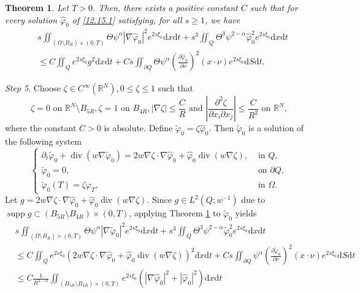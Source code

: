 \documentclass[11pt]{article}
\newcommand{\R}{{\mathbb R}}
\newtheorem{theorem}{Theorem}[section]
\numberwithin{equation}{section}
\def\pt{\partial}
\def\vp{\varphi}
\def\pt{\partial}
\def\Om{\Omega}
\def\al{\alpha}
\def\iy{\infty}
\def\f{\frac}
\def\df{\mathrm d}
\def\wt{\widetilde}
\def\wh{\widehat}
\DeclareMathOperator{\Div}{div}
\DeclareMathOperator{\supp}{{supp}}
\begin{document}
\begin{theorem}\label{12.23.T1}
Let $T>0$. Then, there exists a positive constant $C$ such that for every solution $\wh\vp_0$ of \eqref{12.15.1} satisfying, for all $s\geq 1$, we have
\begin{equation*}
\begin{split}
&s\iint_{(\Om\setminus B_R)\times (0,T)}\Theta \psi^\al |\nabla \wh\vp_0|^2 e^{2s\xi_0}\df x\df t+s^3\iint_Q \Theta^3 \psi^{2-\al}\wh\vp_0^2 e^{2s\xi_0}\df x\df t\\
&\leq C\iint_Q e^{2s\xi_0}g^2\df x\df t+Cs\iint_{\pt Q}\Theta \psi^\al \left(\f{\pt \wh\vp_0}{\pt \nu}\right)^2(x\cdot\nu)e^{2s\xi_0}\df S\df t.
\end{split}
\end{equation*}
\end{theorem}
{\it Step 5}. Choose $\zeta\in C^\iy(\R^N), 0\leq \zeta\leq 1$ such that
\begin{equation*}
\zeta =0 \text{  on }\R^N\setminus B_{5R},   \zeta=1 \text{  on }B_{4R},   |\nabla \zeta|\leq \f{C}{R} \text{  and } \left|\f{\pt^2\zeta}{\pt x_i\pt x_j}\right|\leq \f{C}{R^2} \text{  on }\R^N,
\end{equation*}
where the constant $C>0$ is absolute.
Define $\wt \vp_0=\zeta \wh\vp_0$. Then $\wt\vp_0$ is a solution of the following system
\begin{equation*}
\begin{cases}
\pt_t\wt\vp_0+\Div(w \nabla \wt \vp_0)=2w\nabla\zeta\cdot \nabla\wh\vp_0+\wh\vp_0\Div(w\nabla\zeta), &\text{ in }Q,\\
\wt\vp_0=0, &\text{ on }\pt Q, \\
\wt\vp_0(T)=\zeta \vp_T, &\text{ in }\Om.
\end{cases}
\end{equation*}
Let $g=2w\nabla\zeta\cdot \nabla\wh\vp_0+\wh\vp_0\Div(w\nabla\zeta)$. Since $g\in L^2(Q;w^{-1})$ due to $\supp g\subset (B_{5R}\setminus B_{4R})\times (0,T)$, applying Theorem \ref{12.23.T1} to $\wt\vp_0$ yields
\begin{equation*}
\begin{split}
&s\iint_{(\Om\setminus B_R)\times (0,T)} \Theta \psi^\al |\nabla \wt\vp_0|^2e^{2s\xi_0}\df x\df t+s^3\iint_Q\Theta^3\psi^{2-\al}\wt \vp_0^2e^{2s\xi_0}\df x\df t\\
&\leq C\iint_{Q}e^{2s\xi_0}\left(2w\nabla\zeta\cdot\nabla\wh\vp_0+\wh\vp_0\Div(w\nabla\zeta)\right)^2\df x\df t+Cs\iint_{\pt Q}\psi^\al \left(\f{\pt\wt\vp_0}{\pt \nu}\right)^2(x\cdot\nu)e^{2s\xi_0}\df S\df t\\
&\leq  C\f{1}{R^{2-\al}}\iint_{(B_{5R}\setminus B_{4R})\times (0,T)} e^{2s\xi_0}\left(|\nabla\wh\vp_0|^2+|\wh\vp_0|^2\right)\df x\df t
\end{split}
\end{equation*}
\end{document}
